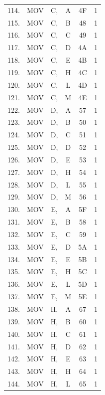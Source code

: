 \documentclass{scrreprt}
\begin{document}
\begin{longtable}{|c|c|c|c|c|c|}
114. & MOV  & C,           & A    & 4F & 1 \\
115. & MOV  & C,           & B    & 48 & 1 \\
116. & MOV  & C,           & C    & 49 & 1 \\
117. & MOV  & C,           & D    & 4A & 1 \\
118. & MOV  & C,           & E    & 4B & 1 \\
119. & MOV  & C,           & H    & 4C & 1 \\
120. & MOV  & C,           & L    & 4D & 1 \\
121. & MOV  & C,           & M    & 4E & 1 \\
122. & MOV  & D,           & A    & 57 & 1 \\
123. & MOV  & D,           & B    & 50 & 1 \\
124. & MOV  & D,           & C    & 51 & 1 \\
125. & MOV  & D,           & D    & 52 & 1 \\
126. & MOV  & D,           & E    & 53 & 1 \\
127. & MOV  & D,           & H    & 54 & 1 \\
128. & MOV  & D,           & L    & 55 & 1 \\
129. & MOV  & D,           & M    & 56 & 1 \\
130. & MOV  & E,           & A    & 5F & 1 \\
131. & MOV  & E,           & B    & 58 & 1 \\
132. & MOV  & E,           & C    & 59 & 1 \\
133. & MOV  & E,           & D    & 5A & 1 \\
134. & MOV  & E,           & E    & 5B & 1 \\
135. & MOV  & E,           & H    & 5C & 1 \\
136. & MOV  & E,           & L    & 5D & 1 \\
137. & MOV  & E,           & M    & 5E & 1 \\
138. & MOV  & H,           & A    & 67 & 1 \\
139. & MOV  & H,           & B    & 60 & 1 \\
140. & MOV  & H,           & C    & 61 & 1 \\
141. & MOV  & H,           & D    & 62 & 1 \\
142. & MOV  & H,           & E    & 63 & 1 \\
143. & MOV  & H,           & H    & 64 & 1 \\
144. & MOV  & H,           & L    & 65 & 1 \\

\end{longtable}
\end{document}
